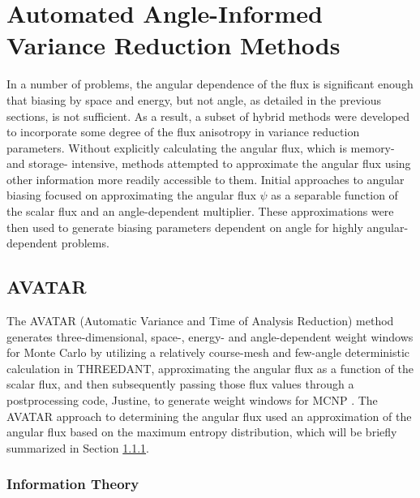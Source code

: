 \section{Automated Angle-Informed Variance Reduction Methods}
\label{sec:AngleVR}

In a number of problems, the angular dependence of the flux is significant enough that
biasing by space and energy, but not angle, as detailed in the previous
sections, is not
sufficient. As a result, a subset of hybrid methods were developed to incorporate some
degree of the flux anisotropy in variance reduction parameters. Without explicitly
calculating the angular flux, which is memory- and storage- intensive, methods
attempted to approximate the angular flux using other information more readily
accessible to them.
Initial approaches
to angular biasing focused on approximating the angular flux $\psi$ as a separable
function of the scalar flux and an angle-dependent multiplier.
These approximations were then used to generate biasing
parameters dependent on angle for highly angular-dependent problems.

\subsection{AVATAR}

The AVATAR \cite{van_riper_generation_1995, van_riper_avatarautomatic_1997}
(Automatic Variance and Time of Analysis Reduction) method generates
three-dimensional, space-, energy- and angle-dependent weight windows for Monte
Carlo by
utilizing a relatively course-mesh and few-angle deterministic calculation in
THREEDANT, approximating the angular flux as a function of the scalar flux, and
then subsequently passing those flux values through a postprocessing
code, Justine, to generate
weight windows for MCNP \cite{mcnp_manual_v1}. The AVATAR approach to
determining the angular flux used an approximation of the angular flux based on
the maximum entropy distribution, which will be briefly summarized in Section
\ref{subsubsec:ITheory}.

\subsubsection{Information Theory}
\label{subsubsec:ITheory}

